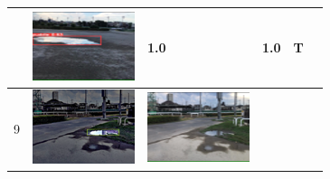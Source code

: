 \documentclass[10pt]{jarticle}
\begin{document}
\begin{table}[H]
\begin{tabular}{|l|l|l|l|l|l|}
\begin{minipage}{.1\textwidth}
           \end{minipage}       & \begin{minipage}{.1\textwidth}
            \centering
            \includegraphics[width=0.9\linewidth]{./fig/tab8_r.png}
           \end{minipage}       & 1.0 & 1.0 & T       \\ \hline
        9  & \begin{minipage}{.1\textwidth}
            \centering
            \includegraphics[width=0.9\linewidth]{./fig/tab9_a.png}
           \end{minipage}       & \begin{minipage}{.1\textwidth}
            \centering
            \includegraphics[width=0.9\linewidth]{./fig/tab9_r.png}

\end{minipage}
\end{tabular}
\end{table}
\end{document}
